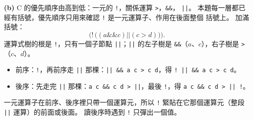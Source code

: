 \begin{pastsoln}
\textbf{(b)} C 的優先順序由高到低：一元的 \texttt{!}，關係運算 \texttt{>}，\texttt{\&\&}，
\texttt{||}。 本題每一層都已經有括號，優先順序只用來確認 \texttt{!} 是一元運算子、作用在後面整個
括號上。 加滿括號：
\[
\bigl(!\,\bigl((a \mathbin{\&\&} c) \mathbin{||} (c > d)\bigr)\bigr).
\]
運算式樹的根是 \texttt{!}，只有一個子節點 \texttt{||}；\texttt{||} 的左子樹是
\texttt{\&\&}（$a$、$c$），右子樹是 \texttt{>}（$c$、$d$）。
\begin{itemize}
\item 前序：\texttt{!}，再前序走 \texttt{||} 那棵：\texttt{|| \&\& a c > c d}，得
\texttt{! || \&\& a c > c d}。
\item 後序：先走完 \texttt{||} 那棵：\texttt{a c \&\& c d > ||}，最後 \texttt{!}，得
\texttt{a c \&\& c d > || !}。
\end{itemize}
一元運算子在前序、後序裡只帶一個運算元，所以 \texttt{!} 緊貼在它那個運算元（整段
\texttt{||} 運算）的前面或後面。 讀後序時遇到 \texttt{!} 只彈出一個值。
\end{pastsoln}
